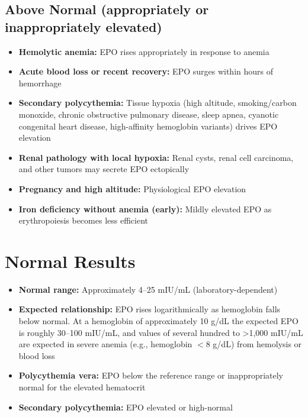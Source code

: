 \subsection*{Above Normal (appropriately or inappropriately elevated)}
\begin{itemize}
  \item \textbf{Hemolytic anemia:} EPO rises appropriately in response to anemia
  \item \textbf{Acute blood loss or recent recovery:} EPO surges within hours of hemorrhage
  \item \textbf{Secondary polycythemia:} Tissue hypoxia (high altitude, smoking/carbon monoxide, chronic obstructive pulmonary disease, sleep apnea, cyanotic congenital heart disease, high-affinity hemoglobin variants) drives EPO elevation
  \item \textbf{Renal pathology with local hypoxia:} Renal cysts, renal cell carcinoma, and other tumors may secrete EPO ectopically
  \item \textbf{Pregnancy and high altitude:} Physiological EPO elevation
  \item \textbf{Iron deficiency without anemia (early):} Mildly elevated EPO as erythropoiesis becomes less efficient
\end{itemize}

\section*{Normal Results}
\begin{itemize}
  \item \textbf{Normal range:} Approximately 4--25 mIU/mL (laboratory-dependent)
  \item \textbf{Expected relationship:} EPO rises logarithmically as hemoglobin falls below normal. At a hemoglobin of approximately 10 g/dL the expected EPO is roughly 30--100 mIU/mL, and values of several hundred to >1,000 mIU/mL are expected in severe anemia (e.g., hemoglobin $<$8 g/dL) from hemolysis or blood loss
  \item \textbf{Polycythemia vera:} EPO below the reference range or inappropriately normal for the elevated hematocrit
  \item \textbf{Secondary polycythemia:} EPO elevated or high-normal
\end{itemize}

